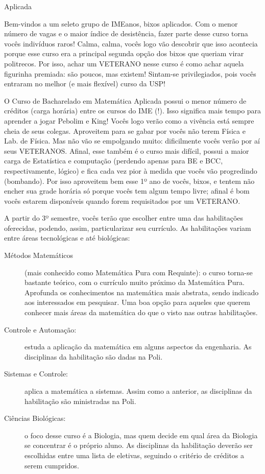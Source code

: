 \begin{subsecao}{Aplicada}

Bem-vindos a um seleto grupo de IMEanos, bixos aplicados. Com o menor número de
vagas e o maior índice de desistência, fazer parte desse curso torna vocês
indivíduos raros!  Calma, calma, vocês logo vão descobrir que isso acontecia
porque esse curso era a principal segunda opção dos bixos que queriam virar
politrecos. Por isso, achar um VETERANO nesse curso é como achar aquela
figurinha premiada: são poucos, mas existem! Sintam-se privilegiados, pois vocês
entraram no melhor (e mais flexível) curso da USP!

O Curso de Bacharelado em Matemática Aplicada possui o menor número de créditos
(carga horária) entre os cursos do IME (!). Isso significa mais tempo para
aprender a jogar Pebolim e King! Vocês logo verão como a vivência está sempre
cheia de seus colegas.  Aproveitem para se gabar por vocês não terem Física e
Lab. de Física. Mas não vão se empolgando muito: dificilmente vocês verão por aí
seus VETERANOS. Afinal, esse também é o curso mais difícil, possui a maior carga
de Estatística e computação (perdendo apenas para BE e BCC, respectivamente,
lógico) e fica cada vez pior à medida que vocês vão progredindo (bombando). Por
isso aproveitem bem esse 1º ano de vocês, bixos, e tentem não encher sua grade
horária só porque vocês tem algum tempo livre; afinal é bom vocês estarem
disponíveis quando forem requisitados por um VETERANO.

A partir do 3º semestre, vocês terão que escolher entre uma das habilitações
oferecidas, podendo, assim, particularizar seu currículo. As habilitações variam
entre áreas tecnológicas e até biológicas:
\begin{description}
\item [Métodos Matemáticos] (mais conhecido como Matemática Pura com Requinte):
  o curso torna-se bastante teórico, com o currículo muito próximo da Matemática
  Pura. Aprofunda os conhecimentos na matemática mais abstrata, sendo indicado
  aos interessados em pesquisar. Uma boa opção para aqueles que querem conhecer
  mais áreas da matemática do que o visto nas outras habilitações.
\item [Controle e Automação:] estuda a aplicação da matemática em alguns
  aspectos da engenharia. As disciplinas da habilitação são dadas na Poli.
\item [Sistemas e Controle:] aplica a matemática a sistemas. Assim como a
  anterior, as disciplinas da habilitação são ministradas na Poli.
\item [Ciências Biológicas:] o foco desse curso é a Biologia, mas quem decide em
  qual área da Biologia se concentrar é o próprio aluno. As disciplinas da
  habilitação deverão ser escolhidas entre uma lista de eletivas, seguindo o
  critério de créditos a serem cumpridos.
\end{description}


\end{subsecao}
